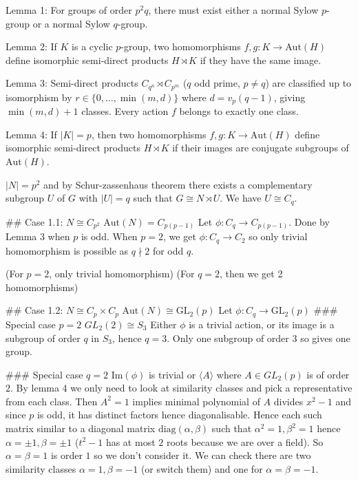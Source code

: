 Lemma 1: For groups of order $p^2 q$, there must exist either a normal Sylow $p$-group or a normal Sylow $q$-group.

Lemma 2: If $K$ is a cyclic $p$-group, two homomorphisms $f, g : K → \text{Aut}(H)$ define
isomorphic semi-direct products $H \rtimes K$ if they have the same image.

Lemma 3: Semi-direct products $C_{q^n} ⋊ C_{p^m}$ ($q$ odd prime, $p ≠ q$) are classified up to
isomorphism by $r ∈ \{0, …, \min(m, d)\}$ where $d = v_p(q - 1)$, giving $\min(m, d) + 1$ classes. Every action $f$ belongs to exactly one class.

Lemma 4: If $|K| = p$, then two homomorphisms $f, g : K → \text{Aut}(H)$ define isomorphic semi-direct products $H \rtimes K$ if their images are conjugate subgroups of $\text{Aut}(H)$.

$|N| = p^2$ and by Schur-zassenhaus theorem there exists a complementary subgroup $U$ of $G$ with $|U| = q$ such that $G \cong N \rtimes U$. We have $U \cong C_q$.

## Case 1.1: $N \cong C_{p^2}$
$\text{Aut}(N) = C_{p(p-1)}$
Let $\phi : C_q \rightarrow C_{p(p-1)}$. Done by Lemma 3 when $p$ is odd. When $p = 2$, we get $\phi : C_q \rightarrow C_2$ so only trivial homomorphism is possible as $q \nmid 2$ for odd $q$.

(For $p = 2$, only trivial homomorphism)
(For $q = 2$, then we get 2 homomorphisms)

## Case 1.2: $N \cong C_p \times C_p$
$\text{Aut}(N) \cong \text{GL}_2(p)$
Let $\phi : C_q \rightarrow \text{GL}_2(p)$
### Special case $p = 2$
$GL_2(2) \cong S_3$
Either $\phi$ is a trivial action, or its image is a subgroup of order $q$ in $S_3$, hence $q = 3$. Only one subgroup of order $3$ so gives one group.

### Special case $q = 2$
$\text{Im}(\phi)$ is trivial or $\langle A \rangle$ where $A \in GL_2(p)$ is of order $2$. By lemma 4 we only need to look at similarity classes and pick a representative from each class. Then $A^2 = 1$ implies minimal polynomial of $A$ divides $x^2 - 1$ and since $p$ is odd, it has distinct factors hence diagonalisable. Hence each such matrix similar to a diagonal matrix $\text{diag}(\alpha, \beta)$ such that $\alpha^2 = 1, \beta^2 = 1$ hence $\alpha = \pm 1, \beta = \pm 1$ ($t^2 - 1$ has at most $2$ roots because we are over a field). So $\alpha = \beta = 1$ is order $1$ so we don't consider it. We can check there are two similarity classes $\alpha = 1, \beta = -1$ (or switch them) and one for $\alpha = \beta = -1$.

